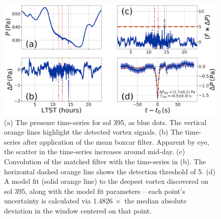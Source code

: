 \documentclass[linenumbers,trackchanges]{aastex63}
\begin{document}
\begin{figure}
    \centering
    \includegraphics[width=\textwidth]{figures/data_conditioning_and_fit.png}
    \caption{(a) The pressure time-series for sol 395, as blue dots. The vertical orange lines highlight the detected vortex signals. (b) The time-series after application of the mean boxcar filter. Apparent by eye, the scatter in the time-series increases around mid-day. (c) Convolution of the matched filter with the time-series in (b). The horizontal dashed orange line shows the detection threshold of 5. (d) A model fit (solid orange line) to the deepest vortex discovered on sol 395, along with the model fit parameters -- each point's uncertainty is calculated via $1.4826\ \times$ the median absolute deviation in the window centered on that point.}
    \label{fig:data_conditioning_and_fit}
\end{figure}
\end{document}
